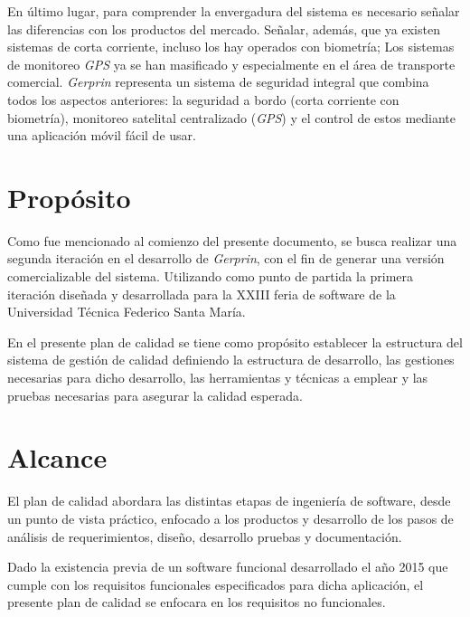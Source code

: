  En último lugar, para comprender la envergadura del sistema es necesario señalar las diferencias con los productos del mercado. Señalar, además, que ya existen sistemas de corta corriente, incluso los hay operados con biometría; Los sistemas de monitoreo \emph{GPS} ya se han masificado y especialmente en el área de transporte comercial. \emph{Gerprin} representa un sistema de seguridad integral que combina todos los aspectos anteriores: la seguridad a bordo (corta corriente con biometría), monitoreo satelital centralizado (\emph{GPS}) y el control de estos mediante una aplicación móvil fácil de usar.

\section{Propósito}

Como fue mencionado al comienzo del presente documento, se busca realizar una segunda iteración en el desarrollo de \emph{Gerprin}, con el fin de generar una versión comercializable del sistema. Utilizando como punto de partida la primera iteración diseñada y desarrollada para la XXIII feria de software de la Universidad Técnica Federico Santa María.

En el presente plan de calidad se tiene como propósito establecer la estructura del sistema de gestión de calidad definiendo la estructura de desarrollo, las gestiones necesarias para dicho desarrollo, las herramientas y técnicas a emplear y las pruebas necesarias para asegurar la calidad esperada.

\section{Alcance}

El plan de calidad abordara las distintas etapas de ingeniería de software, desde un punto de vista práctico, enfocado a los productos y desarrollo de los pasos de análisis de requerimientos, diseño, desarrollo pruebas y documentación.

Dado la existencia previa de un software funcional desarrollado el año 2015 que cumple con los requisitos funcionales especificados para dicha aplicación, el presente plan de calidad se enfocara en los requisitos no funcionales.